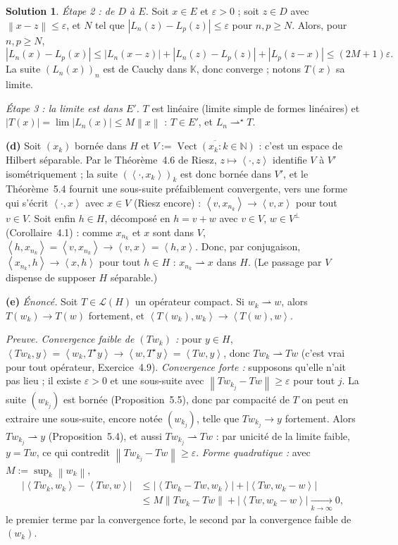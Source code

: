 \documentclass[11pt,a4paper]{article}
\newcommand{\N}{\mathbb{N}}
\newcommand{\K}{\mathbb{K}}
\newcommand{\adh}[1]{\overline{#1}}
\newcommand{\Vect}{\operatorname{Vect}}
\newcommand{\norm}[1]{\left\|#1\right\|}
\newcommand{\ps}[2]{\left\langle #1,#2\right\rangle}
\newcommand{\Lc}{\mathcal{L}}
\newcommand{\wk}{\rightharpoonup}
\newcommand{\wks}{\rightharpoonup^{\!\star}}
\theoremstyle{definition}
\newtheorem*{solution}{Solution}
\begin{document}
\begin{solution}
\emph{Étape 2 : de $D$ à $E$.} Soit $x\in E$ et $\varepsilon>0$ ; soit $z\in D$ avec $\norm{x-z}\le\varepsilon$, et $N$ tel que $|L_n(z)-L_p(z)|\le\varepsilon$ pour $n,p\ge N$. Alors, pour $n,p\ge N$,
\[
|L_n(x)-L_p(x)|\le|L_n(x-z)|+|L_n(z)-L_p(z)|+|L_p(z-x)|\le(2M+1)\varepsilon .
\]
La suite $(L_n(x))_n$ est de Cauchy dans $\K$, donc converge ; notons $T(x)$ sa limite.

\emph{Étape 3 : la limite est dans $E'$.} $T$ est linéaire (limite simple de formes linéaires) et $|T(x)|=\lim|L_n(x)|\le M\norm x$ : $T\in E'$, et $L_n\wks T$.

\medskip
\noindent\textbf{(d)} Soit $(x_k)$ bornée dans $H$ et $V:=\adh{\Vect(x_k:k\in\N)}$ : c'est un espace de Hilbert séparable. Par le Théorème~4.6 de Riesz, $z\mapsto\ps\cdot z$ identifie $V$ à $V'$ isométriquement ; la suite $(\ps\cdot{x_k})_k$ est donc bornée dans $V'$, et le Théorème~5.4 fournit une sous-suite préfaiblement convergente, vers une forme qui s'écrit $\ps\cdot x$ avec $x\in V$ (Riesz encore) : $\ps v{x_{n_k}}\to\ps vx$ pour tout $v\in V$. Soit enfin $h\in H$, décomposé en $h=v+w$ avec $v\in V$, $w\in V^\perp$ (Corollaire~4.1) : comme $x_{n_k}$ et $x$ sont dans $V$, $\ps h{x_{n_k}}=\ps v{x_{n_k}}\to\ps vx=\ps hx$. Donc, par conjugaison, $\ps{x_{n_k}}h\to\ps xh$ pour tout $h\in H$ : $x_{n_k}\wk x$ dans $H$. (Le passage par $V$ dispense de supposer $H$ séparable.)

\medskip
\noindent\textbf{(e)} \emph{Énoncé.} Soit $T\in\Lc(H)$ un opérateur compact. Si $w_k\wk w$, alors $T(w_k)\to T(w)$ fortement, et $\ps{T(w_k)}{w_k}\to\ps{T(w)}w$.

\emph{Preuve.} \emph{Convergence faible de $(Tw_k)$ :} pour $y\in H$, $\ps{Tw_k}y=\ps{w_k}{T^\star y}\to\ps w{T^\star y}=\ps{Tw}y$, donc $Tw_k\wk Tw$ (c'est vrai pour tout opérateur, Exercice~4.9). \emph{Convergence forte :} supposons qu'elle n'ait pas lieu ; il existe $\varepsilon>0$ et une sous-suite avec $\norm{Tw_{k_j}-Tw}\ge\varepsilon$ pour tout $j$. La suite $(w_{k_j})$ est bornée (Proposition~5.5), donc par compacité de $T$ on peut en extraire une sous-suite, encore notée $(w_{k_j})$, telle que $Tw_{k_j}\to y$ fortement. Alors $Tw_{k_j}\wk y$ (Proposition~5.4), et aussi $Tw_{k_j}\wk Tw$ : par unicité de la limite faible, $y=Tw$, ce qui contredit $\norm{Tw_{k_j}-Tw}\ge\varepsilon$. \emph{Forme quadratique :} avec $M:=\sup_k\norm{w_k}$,
\begin{align*}
|\ps{Tw_k}{w_k}-\ps{Tw}w|&\le|\ps{Tw_k-Tw}{w_k}|+|\ps{Tw}{w_k-w}|\\
&\le M\norm{Tw_k-Tw}+|\ps{Tw}{w_k-w}|\xrightarrow[k\to\infty]{}0,
\end{align*}
le premier terme par la convergence forte, le second par la convergence faible de $(w_k)$.
\end{solution}
\end{document}
